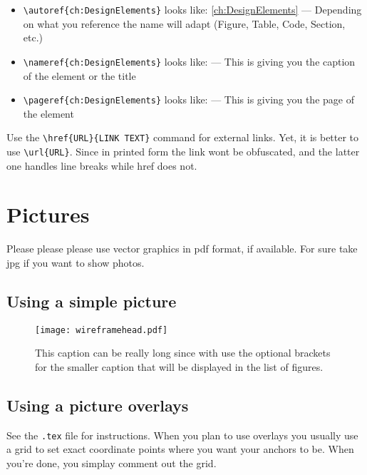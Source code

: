 \begin{itemize}
	\setlength\itemsep{-0.75em} %
	\item \verb|\autoref{ch:DesignElements}| looks like: \autoref{ch:DesignElements} --- Depending on what you reference the name will adapt (Figure, Table, Code, Section, etc.)
	\item \verb|\nameref{ch:DesignElements}| looks like:  --- This is giving you the caption of the element or the title
	\item \verb|\pageref{ch:DesignElements}| looks like: \pageref{ch:DesignElements} --- This is giving you the page of the element
\end{itemize}

Use the \verb|\href{URL}{LINK TEXT}| command for external links. Yet, it is better to use \verb|\url{URL}|. Since in printed form the link wont be obfuscated, and the latter one handles line breaks while href does not.

\section{Pictures}

Please please please use vector graphics in pdf format, if available. For sure take jpg if you want to show photos.

\subsection{Using a simple picture}

\begin{figure}[H]
	\centering\texttt{[image: wireframehead.pdf]}
	\caption[Optional shorter List of Figures Caption]{This caption can be really long since with use the optional brackets for the smaller caption that will be displayed in the list of figures.}
	\label{fig:WireframeHead}
\end{figure}


\subsection{Using a picture overlays}

See the \texttt{.tex} file for instructions. When you plan to use overlays you usually use a grid to set exact coordinate points where you want your anchors to be. When you’re done, you simplay comment out the grid.


